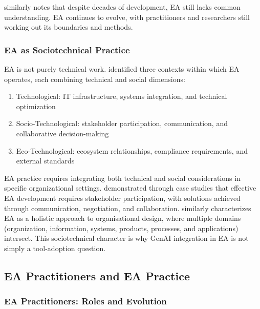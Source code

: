 \textcite{saint-louis_investigation_2019} similarly notes that despite decades
of development, EA still lacks common understanding. EA continues to evolve,
with practitioners and researchers still working out its boundaries and methods.

\subsubsection{EA as Sociotechnical Practice}\label{subsubsec:ea-sociotechnical}

EA is not purely technical work. \textcite{saint-louis_investigation_2019}
identified three contexts within which EA operates, each combining technical and
social dimensions:

\begin{enumerate}
      \item Technological: IT infrastructure, systems integration, and technical
            optimization
      \item Socio-Technological: stakeholder participation, communication, and
            collaborative decision-making
      \item Eco-Technological: ecosystem relationships, compliance requirements,
            and external standards
\end{enumerate}

EA practice requires integrating both technical and social considerations in
specific organizational settings. \textcite{gregor_enterprise_2007} demonstrated
through case studies that effective EA development requires stakeholder
participation, with solutions achieved through communication, negotiation, and
collaboration. \textcite{lankhorst_enterprise_2017} similarly characterizes EA
as a holistic approach to organisational design, where multiple
domains (organization, information, systems, products, processes, and
applications) intersect. This sociotechnical character is why GenAI integration
in EA is not simply a tool-adoption question.

\subsection{EA Practitioners and EA Practice}\label{subsec:ea-practitioners}

\subsubsection{EA Practitioners: Roles and Evolution}\label{subsubsec:ea-roles}

